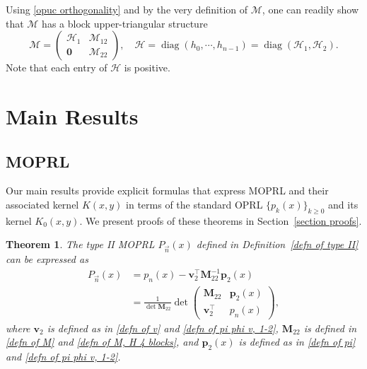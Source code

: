 \documentclass[a4paper,10pt,leqno]{amsart}
\numberwithin{equation}{section}
\newtheorem{theorem}{Theorem}[section]
\theoremstyle{remark}
\newcommand{\magenta}[1]{{\color{magenta} #1}}
\begin{document}
Using \eqref{opuc orthogonality} and by the very definition of $\bm{\mathcal{M}}$, one can readily show that $\bm{\mathcal{M}}$ has a block upper-triangular structure
\begin{equation}\label{eq:M-upper-tri}
\bm{\mathcal{M}} = \begin{pmatrix}
\bm{\mathcal H}_1 & \bm{\mathcal{M}}_{12}\\
\bm{0} & \bm{\mathcal{M}}_{22}
\end{pmatrix}, \quad 
\bm{\mathcal{H}} = \operatorname{diag}(h_0, \cdots, h_{n-1}) = \operatorname{diag}(\bm{\mathcal H}_1, \bm{\mathcal H}_2).
\end{equation}
Note that each entry of $\mathcal{H}$ is positive. 

\section{Main Results} \label{section main results}

\subsection{MOPRL}

Our main results provide explicit formulas that express MOPRL and their associated kernel $K(x,y)$ in terms of the standard OPRL $\{p_k(x)\}_{k \geq 0}$ and its kernel $K_0(x,y)$. We present proofs of these theorems in Section~\ref{section proofs}.

\begin{theorem}\label{typeIIreduction}
The type II MOPRL $P_{\vec{n}}(x)$
defined in Definition~\ref{defn of type II} can be expressed as
\begin{align}
    P_{\vec{n}}(x) &= p_n(x) - \bm{v}_2^\top \bm{M}_{22}^{-1} \bm{p}_2(x)\\
    &= \frac{1}{\det \bm{M}_{22}} \det
\begin{pmatrix}
\bm{M}_{22}  & \bm{p}_2(x)  \\
\bm{v}_2^\top & p_n(x)
\end{pmatrix},
\end{align}
where $\bm{v}_2$ is defined as in  \eqref{defn of v} and \eqref{defn of pi phi v, 1-2}, $\bm{M}_{22}$ is defined in \eqref{defn of M} and \eqref{defn of M, H 4 blocks}, and $\bm{p}_2(x)$ is defined as in \eqref{defn of pi} and \eqref{defn of pi phi v, 1-2}.
\end{theorem}
\end{document}
